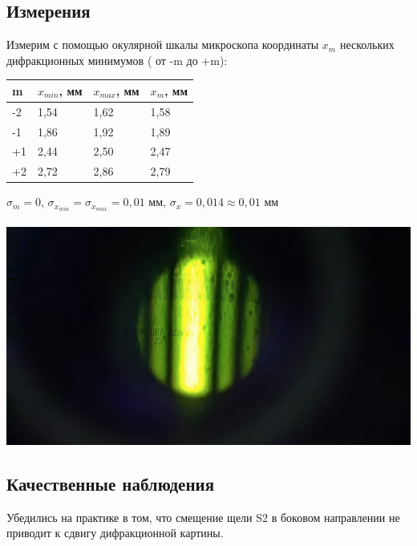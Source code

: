 \documentclass[a4paper]{article}
\begin{document}
\subsection*{Измерения}
Измерим с помощью окулярной шкалы микроскопа координаты $x_m$ нескольких дифракционных минимумов ( от -m до +m):\\
\begin{center}
\begin{tabular}{|l|l|l|l|}
\hline
m & $x_{min}$, мм & $x_{max}$, мм & $x_m$, мм\\
\hline
-2 &1,54 & 1,62 & 1,58\\
\hline
-1 & 1,86 & 1,92 & 1,89\\
\hline
+1 & 2,44 & 2,50 & 2,47\\
\hline
+2 & 2,72 & 2,86 & 2,79\\
\hline
\end{tabular}
\end{center}
$\sigma_m = 0$, $\sigma_{x_{min}} = \sigma_{x_{max}} = 0,01$ мм, $\sigma_x = 0,014 \approx 0,01$ мм\\
\\
\includegraphics[width=18cm]{b1}\\
\subsection*{Качественные наблюдения}
Убедились на практике в том, что смещение щели S2 в боковом направлении не приводит к сдвигу дифракционной картины.\\
\end{document}
